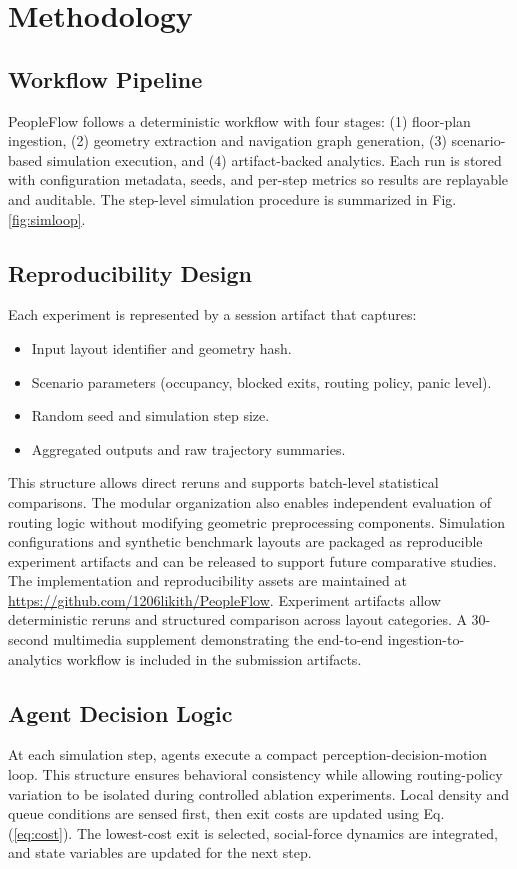 \documentclass[utf8]{FrontiersinHarvard}
\begin{document}
\section{Methodology}
\subsection{Workflow Pipeline}
PeopleFlow follows a deterministic workflow with four stages: (1) floor-plan ingestion, (2) geometry extraction and navigation graph generation, (3) scenario-based simulation execution, and (4) artifact-backed analytics. Each run is stored with configuration metadata, seeds, and per-step metrics so results are replayable and auditable. The step-level simulation procedure is summarized in Fig. \ref{fig:simloop}.

\subsection{Reproducibility Design}
Each experiment is represented by a session artifact that captures:
\begin{itemize}
    \item Input layout identifier and geometry hash.
    \item Scenario parameters (occupancy, blocked exits, routing policy, panic level).
    \item Random seed and simulation step size.
    \item Aggregated outputs and raw trajectory summaries.
\end{itemize}
This structure allows direct reruns and supports batch-level statistical comparisons. The modular organization also enables independent evaluation of routing logic without modifying geometric preprocessing components. Simulation configurations and synthetic benchmark layouts are packaged as reproducible experiment artifacts and can be released to support future comparative studies. The implementation and reproducibility assets are maintained at \url{https://github.com/1206likith/PeopleFlow}.
Experiment artifacts allow deterministic reruns and structured comparison across layout categories.
A 30-second multimedia supplement demonstrating the end-to-end ingestion-to-analytics workflow is included in the submission artifacts.

\subsection{Agent Decision Logic}
At each simulation step, agents execute a compact perception-decision-motion loop. This structure ensures behavioral consistency while allowing routing-policy variation to be isolated during controlled ablation experiments. Local density and queue conditions are sensed first, then exit costs are updated using Eq. (\ref{eq:cost}). The lowest-cost exit is selected, social-force dynamics are integrated, and state variables are updated for the next step.
\end{document}
